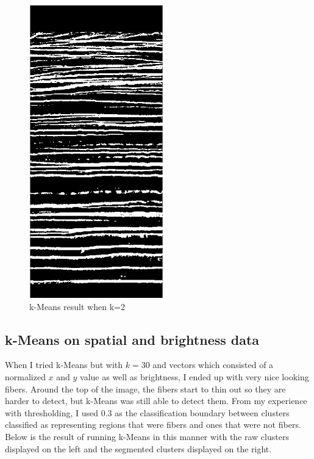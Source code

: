 \documentclass[11pt,psfig]{article}
\begin{document}
\begin{figure}[H]
\centering
\includegraphics[height=5in]{Initial_kMeansSegmentationResult.jpg}
\caption{k-Means result when k=2}
\end{figure}

\subsection{k-Means on spatial and brightness data}

When I tried k-Means but with $k=30$ and vectors which consisted of a normalized $x$ and $y$ value as well as brightness, I ended up with very nice looking fibers. Around the top of the image, the fibers start to thin out so they are harder to detect, but k-Means was still able to detect them. From my experience with thresholding, I used $0.3$ as the classification boundary between clusters classified as representing regions that were fibers and ones that were not fibers. Below is the result of running k-Means in this manner with the raw clusters displayed on the left and the segmented clusters displayed on the right.
\end{document}
